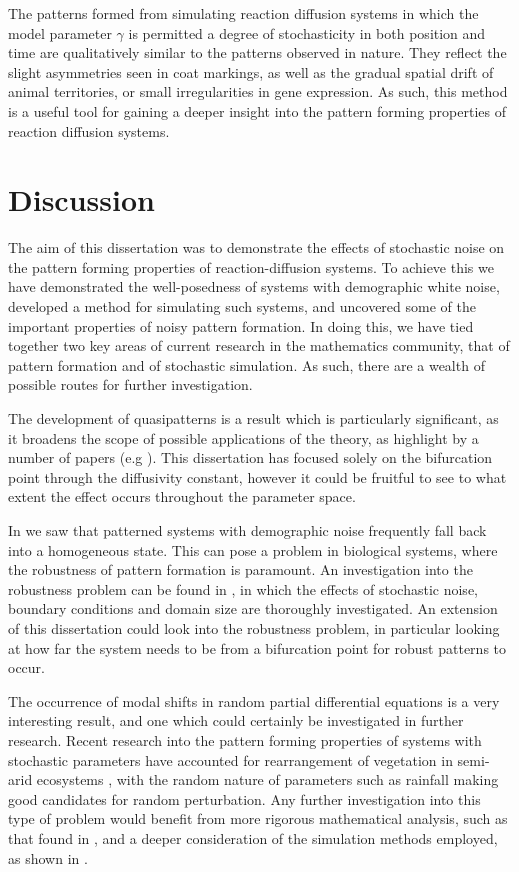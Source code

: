 \documentclass[12pt]{article}
\begin{document}
The patterns formed from simulating reaction diffusion systems in which the model parameter $\gamma$ is permitted a degree of stochasticity in both position and time are qualitatively similar to the patterns observed in nature. They reflect the slight asymmetries seen in coat markings, as well as the gradual spatial drift of animal territories, or small irregularities in gene expression. As such, this method is a useful tool for gaining a deeper insight into the pattern forming properties of reaction diffusion systems.

\section{Discussion}
The aim of this dissertation was to demonstrate the effects of stochastic noise on the pattern forming properties of reaction-diffusion systems. To achieve this we have demonstrated the well-posedness of systems with demographic white noise, developed a method for simulating such systems, and uncovered some of the important properties of noisy pattern formation. In doing this, we have tied together two key areas of current research in the mathematics community, that of pattern formation and of stochastic simulation. As such, there are a wealth of possible routes for further investigation.  

The development of quasipatterns is a result which is particularly significant, as it broadens the scope of possible applications of the theory, as highlight by a number of papers (e.g \cite{Karig, Biancalani, Butler}). This dissertation has focused solely on the bifurcation point through the diffusivity constant, however it could be fruitful to see to what extent the effect occurs throughout the parameter space.   

In  we saw that patterned systems with demographic noise frequently fall back into a homogeneous state. This can pose a problem in biological systems, where the robustness of pattern formation is paramount. An investigation into the robustness problem can be found in \cite{Maini}, in which the effects of stochastic noise, boundary conditions and domain size are thoroughly investigated. An extension of this dissertation could look into the robustness problem, in particular looking at how far the system needs to be from a bifurcation point for robust patterns to occur.     

The occurrence of modal shifts in random partial differential equations is a very interesting result, and one which could certainly be investigated in further research. Recent research into the pattern forming properties of systems with stochastic parameters have accounted for rearrangement of vegetation in semi-arid ecosystems \cite{Siteur, chen}, with the random nature of parameters such as rainfall making good candidates for random perturbation. Any further investigation into this type of problem would benefit from more rigorous mathematical analysis, such as that found in \cite{Lu}, and a deeper consideration of the simulation methods employed, as shown in \cite{Gittelson}.     
\end{document}
